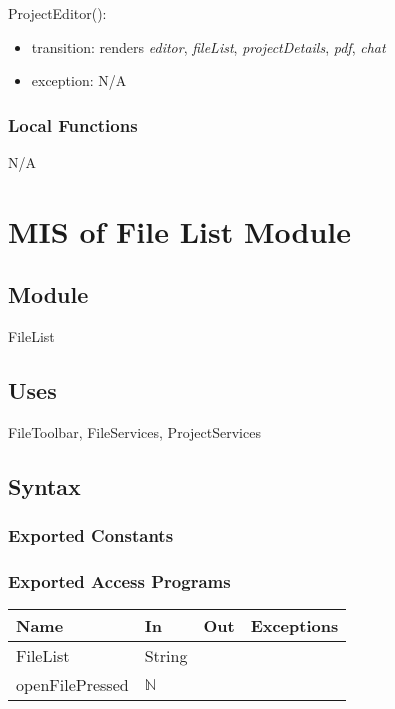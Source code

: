 \documentclass[12pt, titlepage]{article}
\begin{document}
	\noindent ProjectEditor():
	\begin{itemize}
		\item transition: renders \textit{editor}, \textit{fileList}, \textit{projectDetails}, \textit{pdf}, \textit{chat}
		\item exception: N/A
	\end{itemize}
	
	\subsubsection{Local Functions}
	
	N/A
	
	\newpage
	
	\section{MIS of File List Module} \label{Module} 
	
	\subsection{Module}
	
	FileList
	
	\subsection{Uses}
	FileToolbar, FileServices, ProjectServices
	
	\subsection{Syntax}
	
	\subsubsection{Exported Constants}
	
	\subsubsection{Exported Access Programs}
	
	\begin{center}
		\begin{tabular}{p{4cm} p{2cm} p{2cm} p{2cm}}
			\hline
			\textbf{Name} & \textbf{In} & \textbf{Out} & \textbf{Exceptions} \\
			\hline
			FileList  & String &  & ~ \\
			\hline
			openFilePressed & $\mathbb{N}$ & ~ & ~ \\
			\hline
		\end{tabular}
	\end{center}
	
\end{document}
